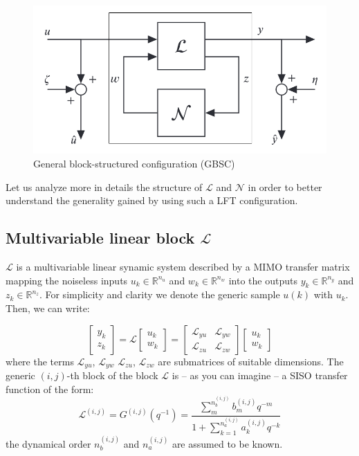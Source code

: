 \begin{figure}[h]
    \centering
    \includegraphics[scale=0.7]{img/LFT.png}
    \caption{General block-structured configuration (GBSC)}
    \label{fig: GBSC}
\end{figure}

Let us analyze more in details the structure of $\mathcal{L}$ and $\mathcal{N}$ in order to better understand the generality gained by using such a LFT configuration.\\

\noindent
\subsection{Multivariable linear block $\mathcal{L}$}
$\mathcal{L}$ is a multivariable linear synamic system described by a MIMO transfer matrix mapping the noiseless inputs $u_k\in\mathbb{R}^{n_u}$ and $w_k\in\mathbb{R}^{n_w}$ into the outputs $y_k\in\mathbb{R}^{n_y}$ and $z_k\in\mathbb{R}^{n_z}$. For simplicity and clarity we denote the generic sample $u(k)$ with $u_k$. Then, we can write:

\begin{equation}
    \begin{bmatrix}
        y_k\\z_k
    \end{bmatrix}=\mathcal{L}\begin{bmatrix}
        u_k\\w_k
    \end{bmatrix}=\begin{bmatrix}
        \mathcal{L}_{yu}&\mathcal{L}_{yw}\\
        \mathcal{L}_{zu}&\mathcal{L}_{zw}
    \end{bmatrix}\begin{bmatrix}
        u_k\\w_k
    \end{bmatrix}
\end{equation}
\noindent
where the terms  $\mathcal{L}_{yu}$, $\mathcal{L}_{yw}$
$\mathcal{L}_{zu}$, $\mathcal{L}_{zw}$ are submatrices of suitable dimensions. The generic $(i,j)$-th block of the block $\mathcal{L}$ is -- as you can imagine -- a SISO transfer function of the form: 
\begin{equation}
    \mathcal{L}^{(i,j)}=G^{(i,j)}(q^{-1})=
    \frac{
        \sum_m^{n_b^{(i,j)}}{b_m^{(i,j)}q^{-m}}
    }
    {
        1+\sum_{k=1}^{n_a^{(i,j)}}{
            a_k^{(i,j)}q^{-k}
        }
    }
\end{equation}
the dynamical order $n_b^{(i,j)}$ and $n_a^{(i,j)}$ are assumed to be known.

